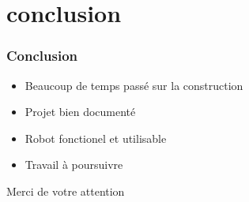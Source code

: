 \section{conclusion}

\begin{frame}
  \frametitle{Conclusion}
  \begin{itemize}
    \item Beaucoup de temps passé sur la construction
    \item Projet bien documenté
    \item Robot fonctionel et utilisable
    \item Travail à poursuivre
  \end{itemize}
\end{frame}

\begin{frame}
  \begin{center}
    \LARGE Merci de votre attention
  \end{center}
\end{frame}

